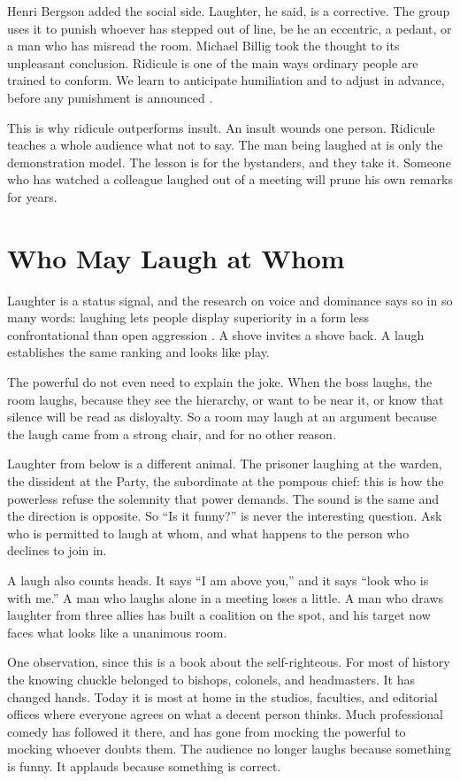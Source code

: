 \documentclass[12pt,a4paper]{book}
\begin{document}
Henri Bergson added the social side. Laughter, he said, is a corrective. The group uses it to punish whoever has stepped out of line, be he an eccentric, a pedant, or a man who has misread the room. Michael Billig took the thought to its unpleasant conclusion. Ridicule is one of the main ways ordinary people are trained to conform. We learn to anticipate humiliation and to adjust in advance, before any punishment is announced \cite{billig2005}.

This is why ridicule outperforms insult. An insult wounds one person. Ridicule teaches a whole audience what not to say. The man being laughed at is only the demonstration model. The lesson is for the bystanders, and they take it. Someone who has watched a colleague laughed out of a meeting will prune his own remarks for years.

\section{Who May Laugh at Whom}

Laughter is a status signal, and the research on voice and dominance says so in so many words: laughing lets people display superiority in a form less confrontational than open aggression \cite{bachorowski2016}. A shove invites a shove back. A laugh establishes the same ranking and looks like play.

The powerful do not even need to explain the joke. When the boss laughs, the room laughs, because they see the hierarchy, or want to be near it, or know that silence will be read as disloyalty. So a room may laugh at an argument because the laugh came from a strong chair, and for no other reason.

Laughter from below is a different animal. The prisoner laughing at the warden, the dissident at the Party, the subordinate at the pompous chief: this is how the powerless refuse the solemnity that power demands. The sound is the same and the direction is opposite. So ``Is it funny?'' is never the interesting question. Ask who is permitted to laugh at whom, and what happens to the person who declines to join in.

A laugh also counts heads. It says ``I am above you,'' and it says ``look who is with me.'' A man who laughs alone in a meeting loses a little. A man who draws laughter from three allies has built a coalition on the spot, and his target now faces what looks like a unanimous room.

One observation, since this is a book about the self-righteous. For most of history the knowing chuckle belonged to bishops, colonels, and headmasters. It has changed hands. Today it is most at home in the studios, faculties, and editorial offices where everyone agrees on what a decent person thinks. Much professional comedy has followed it there, and has gone from mocking the powerful to mocking whoever doubts them. The audience no longer laughs because something is funny. It applauds because something is correct.
\end{document}
